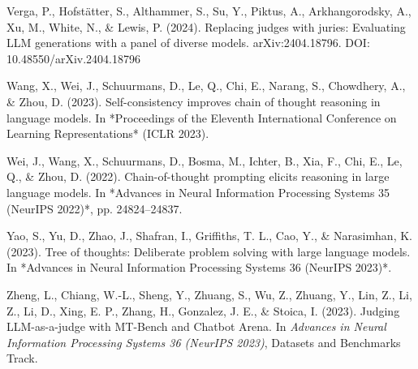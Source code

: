 \documentclass[11pt,a4paper]{article}
\begin{document}
Verga, P., Hofstätter, S., Althammer, S., Su, Y., Piktus, A.,
Arkhangorodsky, A., Xu, M., White, N., \& Lewis, P. (2024). Replacing judges
with juries: Evaluating LLM generations with a panel of diverse models.
arXiv:2404.18796. DOI: 10.48550/arXiv.2404.18796

Wang, X., Wei, J., Schuurmans, D., Le, Q., Chi, E., Narang, S.,
Chowdhery, A., \& Zhou, D. (2023). Self-consistency improves chain of thought
reasoning in language models. In *Proceedings of the Eleventh International
Conference on Learning Representations* (ICLR 2023).

Wei, J., Wang, X., Schuurmans, D., Bosma, M., Ichter, B., Xia, F., Chi, E.,
Le, Q., \& Zhou, D. (2022). Chain-of-thought prompting elicits reasoning in
large language models. In *Advances in Neural Information Processing Systems
35 (NeurIPS 2022)*, pp. 24824–24837.

Yao, S., Yu, D., Zhao, J., Shafran, I., Griffiths, T. L., Cao, Y., \&
Narasimhan, K. (2023). Tree of thoughts: Deliberate problem solving with
large language models. In *Advances in Neural Information Processing Systems
36 (NeurIPS 2023)*.

Zheng, L., Chiang, W.-L., Sheng, Y., Zhuang, S., Wu, Z., Zhuang, Y.,
Lin, Z., Li, Z., Li, D., Xing, E. P., Zhang, H., Gonzalez, J. E., \&
Stoica, I. (2023). Judging LLM-as-a-judge with MT-Bench and Chatbot Arena.
In \textit{Advances in Neural Information Processing Systems 36 (NeurIPS 2023)},
Datasets and Benchmarks Track.
\end{document}
